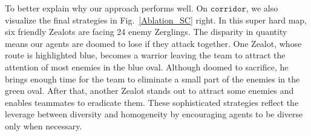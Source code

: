





To better explain why our approach performs well. On $\mathtt{corridor}$, we also visualize the final strategies in Fig.~\ref{Ablation_SC} right. In this super hard map, six friendly Zealots are facing 24 enemy Zerglings. The disparity in quantity means our agents are doomed to lose if they attack together. One Zealot, whose route is highlighted blue, becomes a warrior leaving the team to attract the attention of most enemies in the blue oval. Although doomed to sacrifice, he brings enough time for the team to eliminate a small part of the enemies in the green oval. After that, another Zealot stands out to attract some enemies and enables teammates to eradicate them. These sophisticated strategies reflect the leverage between diversity and homogeneity by encouraging agents to be diverse only when necessary.

